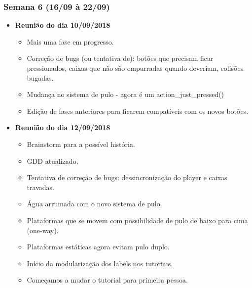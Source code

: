 \documentclass[a4paper, 11pt]{article}
\begin{document}
\subsubsection{Semana 6 (16/09 à 22/09)}
	\begin{itemize} 
		\item \textbf{Reunião do dia 10/09/2018}

		\begin{itemize}
    		
    		\item Mais uma fase em progresso.
    		\item Correção de bugs (ou tentativa de): botões que precisam ficar pressionados, caixas que não são empurradas quando deveriam, colisões bugadas.
    		\item Mudança no sistema de pulo - agora é um action_just_pressed()
    		\item Edição de fases anteriores para ficarem compatíveis com os novos botões.

   		\end{itemize}

		\item \textbf{Reunião do dia 12/09/2018}

		\begin{itemize}
    					
    		\item Brainstorm para a possível história.
    		\item GDD atualizado.
    		\item Tentativa de correção de bugs: dessincronização do player e caixas travadas.
    		\item Água arrumada com o novo sistema de pulo.
    		\item Plataformas que se movem com possibilidade de pulo de baixo para cima (one-way).
    		\item Plataformas estáticas agora evitam pulo duplo.
    		\item Início da modularização dos labels nos tutoriais.
    		\item Começamos a mudar o tutorial para primeira pessoa.

		\end{itemize}

	\end{itemize}
\end{document}
